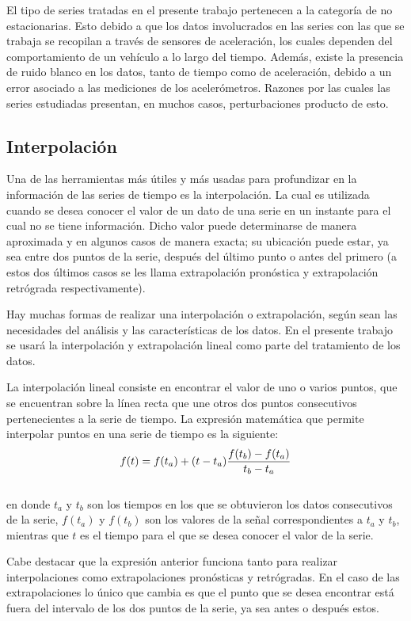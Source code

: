 El tipo de series tratadas en el presente trabajo pertenecen a la categoría de no estacionarias. 
Esto debido a que los datos involucrados en las series con las que se trabaja se recopilan a través de sensores de aceleración, los cuales dependen del comportamiento de un vehículo a lo largo del tiempo. 
Además, existe la presencia de ruido blanco en los datos, tanto de tiempo como de aceleración, debido a un error asociado a las mediciones de los acelerómetros.
Razones por las cuales las series estudiadas presentan, en muchos casos, perturbaciones producto de esto.

\subsection{Interpolación}

Una de las herramientas más útiles y más usadas para profundizar en la información de las series de tiempo es la interpolación. 
La cual es utilizada cuando se desea conocer el valor de un dato de una serie en un instante para el cual no se tiene información. 
Dicho valor puede determinarse de manera aproximada y en algunos casos de manera exacta; su ubicación puede estar, ya sea entre dos puntos de la serie, después del último punto o antes del primero (a estos dos últimos casos se les llama extrapolación pronóstica y extrapolación retrógrada respectivamente).

Hay muchas formas de realizar una interpolación o extrapolación, según sean las necesidades del análisis y las características de los datos. 
En el presente trabajo se usará la interpolación y extrapolación lineal como parte del tratamiento de los datos.

La interpolación lineal consiste en encontrar el valor de uno o varios puntos, que se encuentran sobre la línea recta que une otros dos puntos consecutivos pertenecientes a la serie de tiempo. 
La expresión matemática que permite interpolar puntos en una serie de tiempo es la siguiente:\\

$$f(t)=f(t_{a})+(t-t_{a}){f(t_{b})-f(t_{a})\over t_{b}-t_{a}} $$\\

\noindent en donde $t_{a}$ y $t_{b}$ son los tiempos en los que se obtuvieron los datos consecutivos de la serie, $f(t_{a})$ y $f(t_{b})$ son los valores de la señal correspondientes a $t_{a}$ y $t_{b}$, mientras que $t$ es el tiempo para el que se desea conocer el valor de la serie.

Cabe destacar que la expresión anterior funciona tanto para realizar interpolaciones como extrapolaciones pronósticas y retrógradas. 
En el caso de las extrapolaciones lo único que cambia es que el punto que se desea encontrar está fuera del intervalo de los dos puntos de la serie, ya sea antes o después estos.


